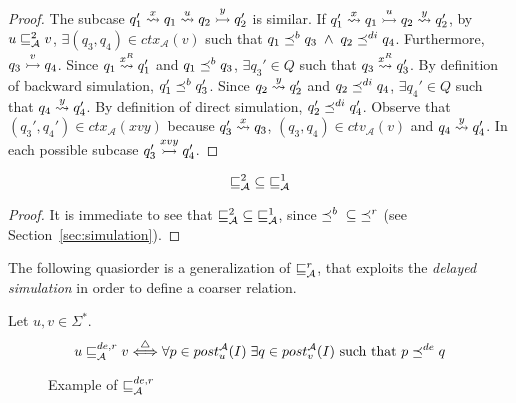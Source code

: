 \begin{proof}
The subcase $q_1' \overset{x}{\rightsquigarrow} q_1 \overset{u}{\rightsquigarrow} q_2 \overset{y}{\rightarrowtail} q_2'$ is similar.
If $q_1' \overset{x}{\rightsquigarrow} q_1 \overset{u}{\rightarrowtail} q_2 \overset{y}{\rightsquigarrow} q_2'$, by $u \sqsubseteq_{\mathcal{A}}^{2} v$,
$\exists (q_3,q_4) \in ctx_{\mathcal{A}}(v)$ such that $q_1 \preceq^b q_3 \; \wedge \; q_2 \preceq^{di} q_4$.
Furthermore, $q_3 \overset{v}{\rightarrowtail} q_4$.
Since $q_1 \overset{x^R}{\rightsquigarrow} q_1'$ and $q_1 \preceq^b q_3$, $\exists q_3' \in Q$ such that
$q_3 \overset{x^R}{\rightsquigarrow} q_3'$.
By definition of backward simulation, $q_1' \preceq^b q_3'$.
Since $q_2 \overset{y}{\rightsquigarrow} q_2'$ and $q_2 \preceq^{di} q_4$, $\exists q_4' \in Q$ such that
$q_4 \overset{y}{\rightsquigarrow} q_4'$.
By definition of direct simulation, $q_2' \preceq^{di} q_4'$.
Observe that $(q_3',q_4') \in ctx_{\mathcal{A}}(xvy)$ because $q_3' \overset{x}{\rightsquigarrow} q_3$,
$(q_3,q_4) \in ctv_{\mathcal{A}}(v)$ and $q_4 \overset{y}{\rightsquigarrow} q_4'$.
In each possible subcase $q_3' \overset{xvy}{\rightarrowtail} q_4'$.
\end{proof}

\begin{proposition}
\label{remark:wsdir-sub-wsdirf}
\[\sqsubseteq_{\mathcal{A}}^{2} \; \subseteq \; \sqsubseteq^1_{\mathcal{A}}\]
\end{proposition}

\begin{proof}
It is immediate to see that $\mathord{\sqsubseteq_{\mathcal{A}}^{2}}  \subseteq  \mathord{\sqsubseteq^1_{\mathcal{A}}}$,
since $\mathord{\preceq^b} \; \subseteq \mathord{\preceq^r}$ (see Section~\ref{sec:simulation}).
\end{proof}


The following quasiorder is a generalization of $\sqsubseteq_{\mathcal{A}}^r$, that exploits the
\emph{delayed simulation} in order to define a coarser relation.

\begin{definition}
\label{defn:wrdel}
Let $u,v \in \Sigma^*$.
\[ u \sqsubseteq_{\mathcal{A}}^{de,r} v \overset{\triangle}{\Longleftrightarrow}
    \forall p \in post_u^{\mathcal{A}}(I) \; \exists q \in post_v^{\mathcal{A}}(I) \textrm{ such that } p \preceq^{de} q \]
\end{definition}

\begin{figure}[h]
\centering
{}
\caption{Example of $\sqsubseteq_{\mathcal{A}}^{de,r}$}
\label{fig:example-wrdel}
\end{figure}

